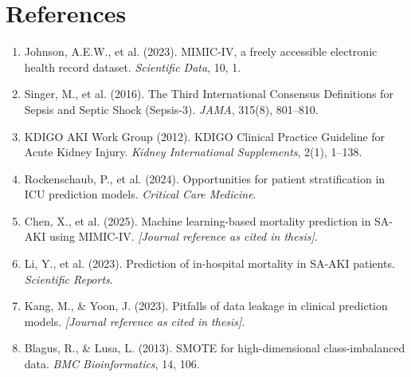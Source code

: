 \documentclass[12pt,a4paper]{article}
\begin{document}
\newpage

\section*{References}

\begin{enumerate}
    \item Johnson, A.E.W., et al. (2023). MIMIC-IV, a freely accessible electronic health record dataset. \textit{Scientific Data}, 10, 1.
    \item Singer, M., et al. (2016). The Third International Consensus Definitions for Sepsis and Septic Shock (Sepsis-3). \textit{JAMA}, 315(8), 801--810.
    \item KDIGO AKI Work Group (2012). KDIGO Clinical Practice Guideline for Acute Kidney Injury. \textit{Kidney International Supplements}, 2(1), 1--138.
    \item Rockenschaub, P., et al. (2024). Opportunities for patient stratification in ICU prediction models. \textit{Critical Care Medicine}.
    \item Chen, X., et al. (2025). Machine learning-based mortality prediction in SA-AKI using MIMIC-IV. \textit{[Journal reference as cited in thesis]}.
    \item Li, Y., et al. (2023). Prediction of in-hospital mortality in SA-AKI patients. \textit{Scientific Reports}.
    \item Kang, M., \& Yoon, J. (2023). Pitfalls of data leakage in clinical prediction models. \textit{[Journal reference as cited in thesis]}.
    \item Blagus, R., \& Lusa, L. (2013). SMOTE for high-dimensional class-imbalanced data. \textit{BMC Bioinformatics}, 14, 106.
\end{enumerate}
\end{document}
